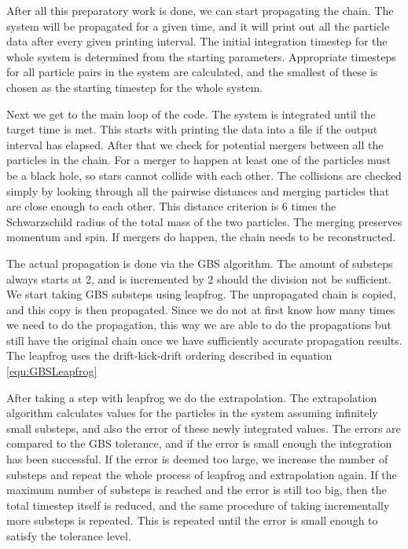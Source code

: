 \documentclass[english, oneside]{HYgradu}
\begin{document}
After all this preparatory work is done, we can start propagating the chain. The system will be propagated for a given time, and it will print out all the particle data after every given printing interval. The initial integration timestep for the whole system is determined from the starting parameters. Appropriate timesteps for all particle pairs in the system are calculated, and the smallest of these is chosen as the starting timestep for the whole system.

Next we get to the main loop of the code. The system is integrated until the target time is met. This starts with printing the data into a file if the output interval has elapsed. After that we check for potential mergers between all the particles in the chain. For a merger to happen at least one of the particles must be a black hole, so stars cannot collide with each other. The collisions are checked simply by looking through all the pairwise distances and merging particles that are close enough to each other. This distance criterion is 6 times the Schwarzschild radius of the total mass of the two particles. The merging preserves momentum and spin. If mergers do happen, the chain needs to be reconstructed.

The actual propagation is done via the GBS algorithm. The amount of substeps always starts at 2, and is incremented by 2 should the division not be sufficient. We start taking GBS substeps using leapfrog.
The unpropagated chain is copied, and this copy is then propagated. Since we do not at first know how many times we need to do the propagation, this way we are able to do the propagations but still have the original chain once we have sufficiently accurate propagation results. The leapfrog uses the drift-kick-drift ordering described in equation \eqref{equ:GBSLeapfrog}

After taking a step with leapfrog we do the extrapolation. The extrapolation algorithm calculates values for the particles in the system assuming infinitely small substeps, and also the error of these newly integrated values. The errors are compared to the GBS tolerance, and if the error is small enough the integration has been successful. If the error is deemed too large, we increase the number of substeps and repeat the whole process of leapfrog and extrapolation again. If the maximum number of substeps is reached and the error is still too big, then the total timestep itself is reduced, and the same procedure of taking incrementally more substeps is repeated. This is repeated until the error is small enough to satisfy the tolerance level.
\end{document}
